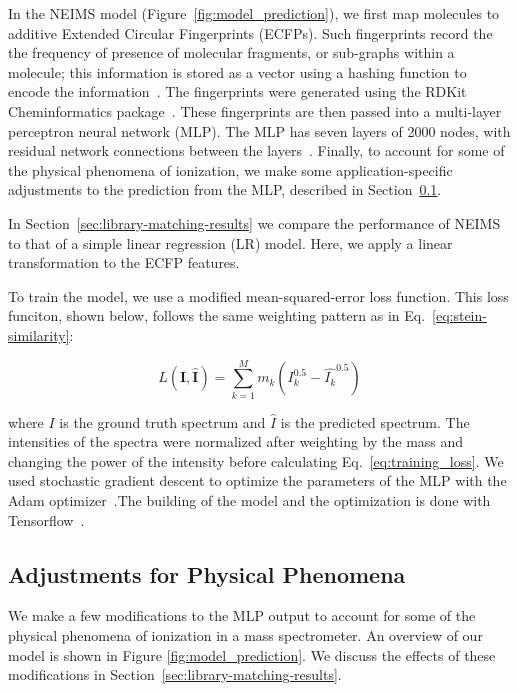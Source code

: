 In the NEIMS model (Figure~\ref{fig:model_prediction}), we first map molecules to additive Extended Circular Fingerprints (ECFPs).  Such fingerprints record the the frequency of presence of molecular fragments, or sub-graphs within a molecule; this information is stored as a vector using a hashing function to encode the information~\cite{Rogers_2010_ECFP}. The fingerprints were generated using the RDKit Cheminformatics package~\cite{rdkit}.
These fingerprints are then passed into a multi-layer perceptron neural network (MLP). The MLP has seven layers of 2000 nodes, with residual network connections between the layers~\cite{he_resnet}. Finally, to account for some of the physical phenomena of ionization, we make some application-specific adjustments to the prediction from the MLP, described in Section~\ref{sec:ms_physical_phenomena}.

In Section~\ref{sec:library-matching-results} we compare the performance of NEIMS to that of a simple linear regression (LR) model. Here, we apply a linear transformation to the ECFP features.

To train the model, we use a modified mean-squared-error loss function. This loss funciton, shown below, follows the same weighting pattern as in Eq.~\ref{eq:stein-similarity}:

\begin{equation}\label{eq:training_loss}
    L(\boldsymbol{I}, \hat{\boldsymbol{I}}) = \sum_{k=1}^{M} m_k (I_k^{0.5} - \hat{I_k}^{0.5})
\end{equation}

where $I$ is the ground truth spectrum and $\hat{I}$ is the predicted spectrum. The intensities of the spectra were normalized after weighting by the mass and changing the power of the intensity before calculating Eq.~\eqref{eq:training_loss}. We used stochastic gradient descent to optimize the parameters of the MLP with the Adam optimizer~\cite{Kingma_adam_optimizer}.The building of the model and the optimization is done with Tensorflow~\cite{tensorflow2015-whitepaper}.

\subsection{Adjustments for Physical Phenomena}\label{sec:ms_physical_phenomena}

We make a few modifications to the MLP output to account for some of the physical phenomena of ionization in a mass spectrometer. An overview of our model is shown in Figure \ref{fig:model_prediction}. We discuss the effects of these modifications in Section~\ref{sec:library-matching-results}.

